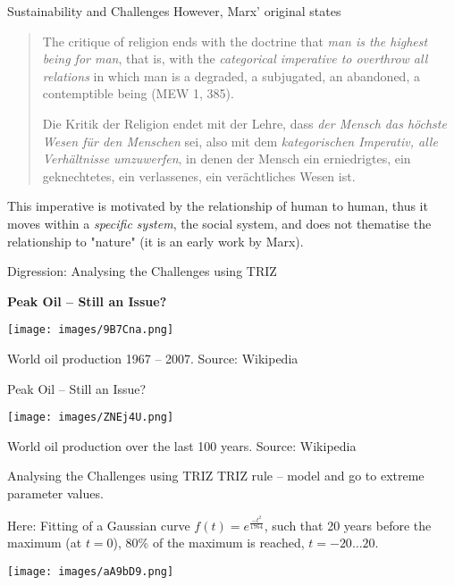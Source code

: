 \documentclass{beamer}
\begin{document}
\begin{frame}{Sustainability and Challenges}
  However, Marx' original states
  \begin{quote}\rm
    The critique of religion ends with the doctrine that \emph{man is the
      highest being for man}, that is, with the \emph{categorical imperative
      to overthrow all relations} in which man is a degraded, a subjugated, an
    abandoned, a contemptible being (MEW 1, 385).\medskip

    Die Kritik der Religion endet mit der Lehre, dass \emph{der Mensch das
      höchste Wesen für den Menschen} sei, also mit dem \emph{kategorischen
      Imperativ, alle Verhältnisse umzuwerfen}, in denen der Mensch ein
    erniedrigtes, ein geknechtetes, ein verlassenes, ein verächtliches Wesen
    ist.
  \end{quote}
  This imperative is motivated by the relationship of human to human, thus it
  moves within a \emph{specific system}, the social system, and does not
  thematise the relationship to "nature" (it is an early work by Marx).
\end{frame}

\begin{frame}{Digression: Analysing the Challenges using TRIZ}

  \begin{center}\large\bf  Peak Oil -- Still an Issue? \end{center}
  
  \begin{center}
    \texttt{[image: images/9B7Cna.png]}
  
    World oil production 1967 -- 2007. Source: Wikipedia
  \end{center}
\end{frame}

\begin{frame}{Peak Oil -- Still an Issue?}

  \begin{center}
    \texttt{[image: images/ZNEj4U.png]}
  
    World oil production over the last 100 years. Source: Wikipedia
  \end{center}
\end{frame}

\begin{frame}{Analysing the Challenges using TRIZ}
  TRIZ rule -- model and go to extreme parameter values.

  Here: Fitting of a Gaussian curve $f(t)=e^{\frac{-t^2}{1764}}$, such that 20
  years before the maximum (at $t=0$), 80\% of the maximum is reached,
  $t=-20\ldots20$.
  \begin{center}
    \texttt{[image: images/aA9bD9.png]}
  \end{center}
\end{frame}
\end{document}

